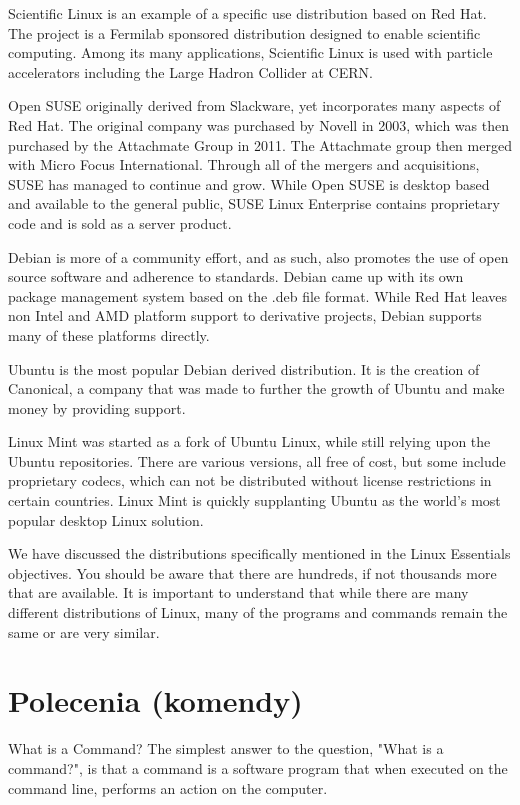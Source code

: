 \documentclass[a4paper,titlepage,12pt]{mwart}
\begin{document}
Scientific Linux is an example of a specific use distribution based on Red Hat. The project is a Fermilab sponsored distribution designed to enable scientific computing. Among its many applications, Scientific Linux is used with particle accelerators including the Large Hadron Collider at CERN.

Open SUSE originally derived from Slackware, yet incorporates many aspects of Red Hat. The original company was purchased by Novell in 2003, which was then purchased by the Attachmate Group in 2011. The Attachmate group then merged with Micro Focus International. Through all of the mergers and acquisitions, SUSE has managed to continue and grow. While Open SUSE is desktop based and available to the general public, SUSE Linux Enterprise contains proprietary code and is sold as a server product.

Debian is more of a community effort, and as such, also promotes the use of open source software and adherence to standards. Debian came up with its own package management system based on the .deb file format. While Red Hat leaves non Intel and AMD platform support to derivative projects, Debian supports many of these platforms directly.

Ubuntu is the most popular Debian derived distribution. It is the creation of Canonical, a company that was made to further the growth of Ubuntu and make money by providing support.

Linux Mint was started as a fork of Ubuntu Linux, while still relying upon the Ubuntu repositories. There are various versions, all free of cost, but some include proprietary codecs, which can not be distributed without license restrictions in certain countries. Linux Mint is quickly supplanting Ubuntu as the world's most popular desktop Linux solution.

We have discussed the distributions specifically mentioned in the Linux Essentials objectives. You should be aware that there are hundreds, if not thousands more that are available. It is important to understand that while there are many different distributions of Linux, many of the programs and commands remain the same or are very similar.
\section{Polecenia (komendy)}
What is a Command?
The simplest answer to the question, "What is a command?", is that a command is a software program that when executed on the command line, performs an action on the computer.
\end{document}
